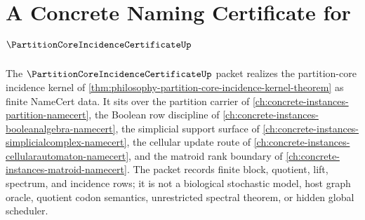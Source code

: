 \chapter{A Concrete Naming Certificate for $\PartitionCoreIncidenceCertificateUp$}
\label{ch:concrete-instances-partition-core-incidence-certificate-namecert}

The $\PartitionCoreIncidenceCertificateUp$ packet realizes the partition-core incidence kernel of \autoref{thm:philosophy-partition-core-incidence-kernel-theorem} as finite NameCert data. It sits over the partition carrier of \autoref{ch:concrete-instances-partition-namecert}, the Boolean row discipline of \autoref{ch:concrete-instances-booleanalgebra-namecert}, the simplicial support surface of \autoref{ch:concrete-instances-simplicialcomplex-namecert}, the cellular update route of \autoref{ch:concrete-instances-cellularautomaton-namecert}, and the matroid rank boundary of \autoref{ch:concrete-instances-matroid-namecert}. The packet records finite block, quotient, lift, spectrum, and incidence rows; it is not a biological stochastic model, host graph oracle, quotient codon semantics, unrestricted spectral theorem, or hidden global scheduler.



